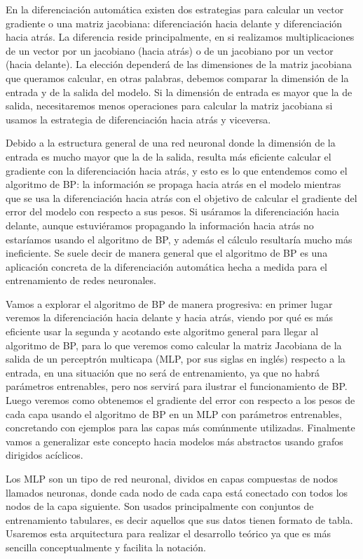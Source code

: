 En la diferenciación automática existen dos estrategias para calcular un vector gradiente o una matriz jacobiana: diferenciación hacia delante y diferenciación hacia atrás. La diferencia reside  principalmente, en si realizamos multiplicaciones de un vector por un jacobiano (hacia atrás) o de un jacobiano por un vector (hacia delante). La elección dependerá de las dimensiones de la matriz jacobiana que queramos calcular, en otras palabras, debemos comparar la dimensión de la entrada y de la salida del modelo. Si la dimensión de entrada es mayor que la de salida, necesitaremos menos operaciones para calcular la matriz jacobiana si usamos la estrategia de diferenciación hacia atrás y viceversa. 

Debido a la estructura general de una red neuronal donde la dimensión de la entrada es mucho mayor que la de la salida, resulta más eficiente calcular el gradiente con la diferenciación hacia atrás, y esto es lo que entendemos como el algoritmo de BP: la información se propaga hacia atrás en el modelo mientras que se usa la diferenciación hacia atrás con el objetivo de calcular el gradiente del error del modelo con respecto a sus pesos. Si usáramos la diferenciación hacia delante, aunque estuviéramos propagando la información hacia atrás no estaríamos usando el algoritmo de BP, y además el cálculo resultaría mucho más ineficiente. Se suele decir de manera general que el algoritmo de BP es una aplicación concreta de la diferenciación automática hecha a medida para el entrenamiento de redes neuronales.


Vamos a explorar el algoritmo de BP de manera progresiva: en primer lugar veremos la diferenciación hacia delante y hacia atrás, viendo por qué es más eficiente usar la segunda y acotando este algoritmo general para llegar al algoritmo de BP, para lo que veremos como calcular la matriz Jacobiana de la salida de un perceptrón multicapa (MLP, por sus siglas en inglés) respecto a la entrada, en una situación que no será de entrenamiento, ya que no habrá parámetros entrenables, pero nos servirá para ilustrar el funcionamiento de BP. Luego veremos como obtenemos el gradiente del error con respecto a los pesos de cada capa usando el algoritmo de BP en un MLP con parámetros entrenables, concretando con ejemplos para las capas más comúnmente utilizadas. Finalmente vamos a generalizar este concepto hacia modelos más abstractos usando grafos dirigidos acíclicos. 


Los MLP son un tipo de red neuronal, dividos en capas compuestas de nodos llamados neuronas, donde cada nodo de cada capa está conectado con todos los nodos de la capa siguiente. Son usados principalmente con conjuntos de entrenamiento tabulares, es decir aquellos que sus datos tienen formato de tabla. Usaremos esta arquitectura para realizar el desarrollo teórico ya que es más sencilla conceptualmente y facilita la notación. 

